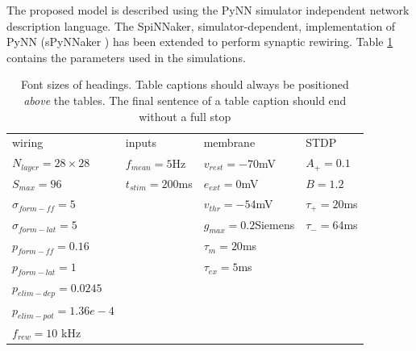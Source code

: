 \documentclass[letterpaper, 10 pt, conference]{ieeeconf}  %
\begin{document}
The proposed model is described using the PyNN \cite{davison2009pynn} simulator independent network description language. The SpiNNaker, simulator-dependent, implementation of PyNN (sPyNNaker \cite{rhodes2018spynnaker}) has been extended to perform synaptic rewiring. Table \ref{tab:sim_params} contains the parameters used in the simulations.

\setlength{\tabcolsep}{4pt}
\begin{table}
\setlength{\tabcolsep}{18pt} %
\begin{center}
\caption{Font sizes of headings. Table captions should always be
positioned {\it above} the tables. The final sentence of a table
caption should end without a full stop}
\label{tab:sim_params}
\begin{tabular}{llll}
\hline\noalign{\smallskip}
    wiring & inputs & membrane & STDP \\
\noalign{\smallskip}
\hline
\noalign{\smallskip}
    $N_{layer}=28\times28$ 	& $f_{mean}=5$Hz 	& $v_{rest} = -70$mV 	& $A_{+} = 0.1$ \\
    $S_{max}=96 $ 			& $t_{stim}=200$ms 	& $e_{ext} = 0$mV  		& $B = 1.2$	   \\
    $\sigma_{form-ff}=5$		& ~ 			& $v_{thr} = -54$mV 		& $\tau_{+} = 20$ms \\
    $\sigma_{form-lat}=5$ 		& ~ 			& $g_{max} = 0.2$Siemens& $\tau_{-} = 64$ms \\
    $p_{form-ff}=0.16$ 		    & ~  			& $\tau_{m}=20$ms  		& ~ \\
    $p_{form-lat}=1$ 			& ~  			& $\tau_{ex}=5$ms 		& ~ \\
    $p_{elim-dep}=0.0245$		& ~  			& ~                     & ~ \\
    $p_{elim-pot}=1.36 e -4$ 	& ~  			& ~	                    & ~ \\
    $f_{rew}=10$ kHz			& ~  			& ~                     & ~ \\
\hline
\end{tabular}
\end{center}
\end{table}
\setlength{\tabcolsep}{1.4pt}
\end{document}
